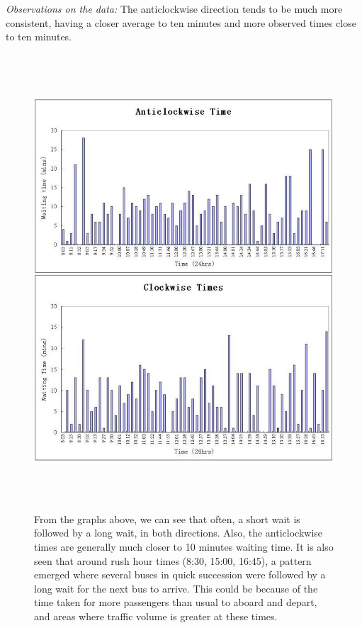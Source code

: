 {\it Observations on the data:}
The anticlockwise direction tends to be much more consistent, having a closer average to ten minutes and more observed times close to ten minutes.
\begin{figure}
\begin{center}
\includegraphics[width=12cm,height=17cm]{figures/OrbiterBusWaitingTimes.pdf}
\caption{From the graphs above, we can see that often, a short wait is followed by a long wait, in both directions. Also, the anticlockwise times are generally much closer to 10 minutes waiting time. It is also seen that around rush hour times (8:30, 15:00, 16:45), a pattern emerged where several buses in quick succession were followed by a long wait for the next bus to arrive. This could be because of the time taken for more passengers than usual to aboard and depart, and areas where traffic volume is greater at these times.}
\end{center}
\end{figure}

